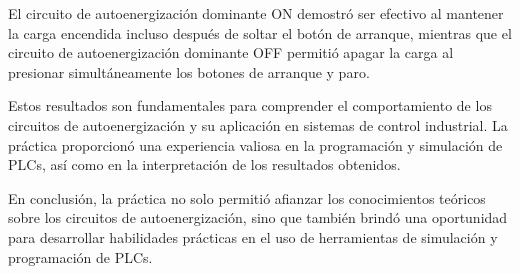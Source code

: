\documentclass[12pt]{report}
\begin{document}
El circuito de autoenergización dominante ON demostró ser efectivo al mantener la carga encendida incluso después de soltar el botón de arranque, mientras que el circuito de autoenergización dominante OFF permitió apagar la carga al presionar simultáneamente los botones de arranque y paro.

Estos resultados son fundamentales para comprender el comportamiento de los circuitos de autoenergización y su aplicación en sistemas de control industrial. La práctica proporcionó una experiencia valiosa en la programación y simulación de PLCs, así como en la interpretación de los resultados obtenidos.

En conclusión, la práctica no solo permitió afianzar los conocimientos teóricos sobre los circuitos de autoenergización, sino que también brindó una oportunidad para desarrollar habilidades prácticas en el uso de herramientas de simulación y programación de PLCs.
\newpage
\end{document}
